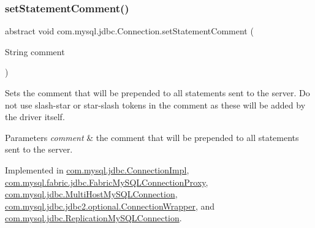 \subsubsection{\texorpdfstring{set\+Statement\+Comment()}{setStatementComment()}}
{\footnotesize\ttfamily abstract void com.\+mysql.\+jdbc.\+Connection.\+set\+Statement\+Comment (\begin{DoxyParamCaption}\item[{String}]{comment }\end{DoxyParamCaption})\hspace{0.3cm}{\ttfamily [abstract]}}

Sets the comment that will be prepended to all statements sent to the server. Do not use slash-\/star or star-\/slash tokens in the comment as these will be added by the driver itself.


\begin{DoxyParams}{Parameters}
{\em comment} & the comment that will be prepended to all statements sent to the server. \\
\hline
\end{DoxyParams}


Implemented in \mbox{\hyperlink{classcom_1_1mysql_1_1jdbc_1_1_connection_impl_ad8da7624bbff49fa21cc06227fa66258}{com.\+mysql.\+jdbc.\+Connection\+Impl}}, \mbox{\hyperlink{classcom_1_1mysql_1_1fabric_1_1jdbc_1_1_fabric_my_s_q_l_connection_proxy_a87005e6537bac73cbfa1608a6ca7935b}{com.\+mysql.\+fabric.\+jdbc.\+Fabric\+My\+S\+Q\+L\+Connection\+Proxy}}, \mbox{\hyperlink{classcom_1_1mysql_1_1jdbc_1_1_multi_host_my_s_q_l_connection_ae16daacee48aa9a98fa24374bf6e7681}{com.\+mysql.\+jdbc.\+Multi\+Host\+My\+S\+Q\+L\+Connection}}, \mbox{\hyperlink{classcom_1_1mysql_1_1jdbc_1_1jdbc2_1_1optional_1_1_connection_wrapper_a31c5d98ba9578549f71ddae31c27fc7b}{com.\+mysql.\+jdbc.\+jdbc2.\+optional.\+Connection\+Wrapper}}, and \mbox{\hyperlink{classcom_1_1mysql_1_1jdbc_1_1_replication_my_s_q_l_connection_aa7fc0fd1686f31130f8737f89087b8bd}{com.\+mysql.\+jdbc.\+Replication\+My\+S\+Q\+L\+Connection}}.

